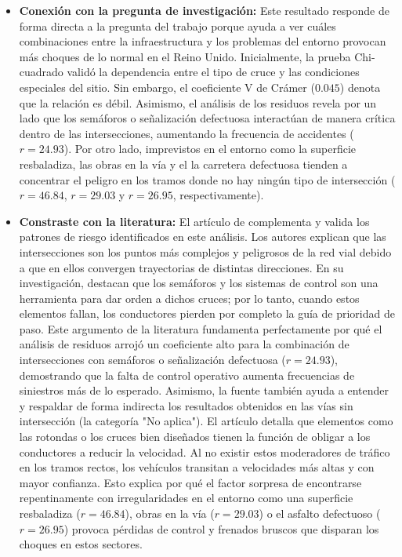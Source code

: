 \documentclass[12pt]{article}
\begin{document}
\begin{itemize}
    \item \textbf{Conexión con la pregunta de investigación:} Este resultado responde 
    de forma directa a la pregunta del trabajo porque ayuda a ver cuáles combinaciones 
    entre la infraestructura y los problemas del entorno provocan más choques de lo 
    normal en el Reino Unido. Inicialmente, la prueba Chi-cuadrado validó la 
    dependencia entre el tipo de cruce y las condiciones especiales del sitio. 
    Sin embargo,  el coeficiente V de Crámer ($0.045$) denota que la relación es débil.
Asimismo, el análisis de los residuos revela por un lado que los semáforos o 
señalización defectuosa interactúan de manera crítica dentro de las intersecciones, 
aumentando la frecuencia de accidentes ($r = 24.93$). Por otro lado, imprevistos en 
el entorno como la superficie resbaladiza, las obras en la vía y el la carretera 
defectuosa tienden a concentrar el peligro en los tramos donde no hay ningún tipo 
de intersección ($r = 46.84$, $r = 29.03$ y $r = 26.95$, respectivamente).

    
	\item \textbf{Constraste con la literatura:} El artículo de \textcite{yannis_effectiveness_junctions} 
	complementa y valida  los patrones de riesgo identificados en este análisis. Los autores 
	explican que las intersecciones son los puntos más complejos y peligrosos de la red vial 
	debido a que en ellos convergen trayectorias de distintas direcciones. En su investigación,
	destacan que los semáforos y los sistemas de control son una herramienta para dar orden 
	a dichos cruces; por lo tanto, cuando estos elementos fallan, los conductores pierden 
	por completo la guía de prioridad de paso. Este argumento de la literatura fundamenta 
	perfectamente por qué el análisis de residuos arrojó un coeficiente alto para la 
	combinación de intersecciones con semáforos o señalización defectuosa ($r = 24.93$), 
	demostrando que la falta de control operativo aumenta frecuencias de siniestros más 
	de lo esperado.
Asimismo, la fuente también ayuda a entender y respaldar de forma indirecta los 
resultados obtenidos en las vías sin intersección (la categoría "No aplica"). El 
artículo detalla que elementos como las rotondas o los cruces bien diseñados tienen
la función de obligar a los conductores a reducir la velocidad. Al no existir estos 
moderadores de tráfico en los tramos rectos, los vehículos transitan a velocidades 
más altas y con mayor confianza. Esto explica por qué el factor sorpresa de encontrarse 
repentinamente con irregularidades en el entorno como una superficie resbaladiza 
($r = 46.84$), obras en la vía ($r = 29.03$) o el asfalto defectuoso ($r = 26.95$) 
provoca pérdidas de control y frenados bruscos que disparan los choques en estos sectores.


\end{itemize}
\end{document}
